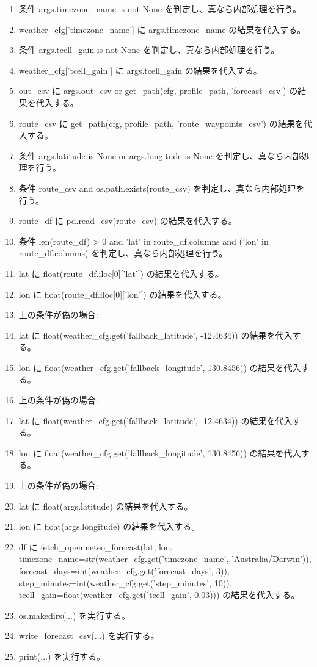 \documentclass[a4paper,11pt]{article}
\begin{document}
\begin{enumerate}[leftmargin=1.8em]
\item 条件 args.timezone\_name is not None を判定し、真なら内部処理を行う。
\item   weather\_cfg['timezone\_name'] に args.timezone\_name の結果を代入する。
\item 条件 args.tcell\_gain is not None を判定し、真なら内部処理を行う。
\item   weather\_cfg['tcell\_gain'] に args.tcell\_gain の結果を代入する。
\item out\_csv に args.out\_csv or get\_path(cfg, profile\_path, 'forecast\_csv') の結果を代入する。
\item route\_csv に get\_path(cfg, profile\_path, 'route\_waypoints\_csv') の結果を代入する。
\item 条件 args.latitude is None or args.longitude is None を判定し、真なら内部処理を行う。
\item   条件 route\_csv and os.path.exists(route\_csv) を判定し、真なら内部処理を行う。
\item     route\_df に pd.read\_csv(route\_csv) の結果を代入する。
\item     条件 len(route\_df) > 0 and 'lat' in route\_df.columns and ('lon' in route\_df.columns) を判定し、真なら内部処理を行う。
\item       lat に float(route\_df.iloc[0]['lat']) の結果を代入する。
\item       lon に float(route\_df.iloc[0]['lon']) の結果を代入する。
\item       上の条件が偽の場合:
\item       lat に float(weather\_cfg.get('fallback\_latitude', -12.4634)) の結果を代入する。
\item       lon に float(weather\_cfg.get('fallback\_longitude', 130.8456)) の結果を代入する。
\item     上の条件が偽の場合:
\item     lat に float(weather\_cfg.get('fallback\_latitude', -12.4634)) の結果を代入する。
\item     lon に float(weather\_cfg.get('fallback\_longitude', 130.8456)) の結果を代入する。
\item   上の条件が偽の場合:
\item   lat に float(args.latitude) の結果を代入する。
\item   lon に float(args.longitude) の結果を代入する。
\item df に fetch\_openmeteo\_forecast(lat, lon, timezone\_name=str(weather\_cfg.get('timezone\_name', 'Australia/Darwin')), forecast\_days=int(weather\_cfg.get('forecast\_days', 3)), step\_minutes=int(weather\_cfg.get('step\_minutes', 10)), tcell\_gain=float(weather\_cfg.get('tcell\_gain', 0.03))) の結果を代入する。
\item os.makedirs(...) を実行する。
\item write\_forecast\_csv(...) を実行する。
\item print(...) を実行する。
            \end{enumerate}
\end{document}
